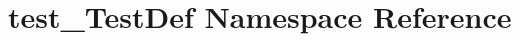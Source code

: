 \hypertarget{namespacetest__TestDef}{\section{test\-\_\-\-Test\-Def Namespace Reference}
\label{namespacetest__TestDef}
}
